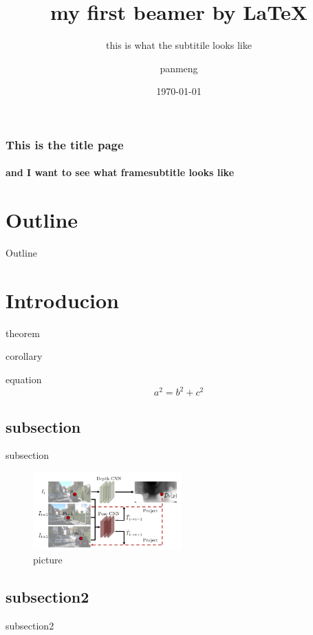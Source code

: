 \documentclass{beamer}
\title{my first beamer by \LaTeX}
\subtitle{this is what the subtitile looks like}
\author{panmeng}
\institute{ise}
\date{\today}
\begin{document}
    \begin{frame}
        \frametitle{This is the title page}
        \framesubtitle{and I want to see what framesubtitle looks like}
    \end{frame}

\section*{Outline}
    \begin{frame}{Outline}
        \tableofcontents
    \end{frame}

\section{Introducion}
    \begin{frame}
        \begin{theorem}
            theorem
        \end{theorem}

        \begin{corollary}
            corollary
        \end{corollary}

        \begin{block}{equation}
            \begin{equation}
                a^2 = b^2 + c^2
            \end{equation}
        \end{block}
    \end{frame}

\subsection{subsection}
    \begin{frame}
        subsection
        \begin{figure}
        \includegraphics[height=3cm]{img/sfm.png}
        \caption{picture}
        \end{figure}
    \end{frame}
\subsection{subsection2}
    \begin{frame}
        subsection2
    \end{frame}
\end{document}
